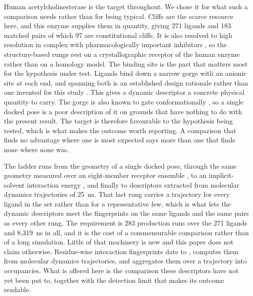 Human acetylcholinesterase is the target throughout. We chose it for what such a
comparison needs rather than for being typical. Cliffs are the scarce resource here,
and this enzyme supplies them in quantity, giving 271 ligands and 183 matched pairs of
which 97 are constitutional cliffs. It is also resolved to high resolution in complex
with pharmacologically important inhibitors \citep{cheung2012}, so the structure-based
rungs rest on a crystallographic receptor of the human enzyme rather than on a homology
model. The binding site is the part that matters most for the hypothesis under test.
Ligands bind down a narrow gorge with an anionic site at each end, and spanning both is
an established design rationale rather than one invented for this study
\citep{grabowska2025}. This gives a dynamic descriptor a concrete physical quantity to
carry. The gorge is also known to gate conformationally \citep{gating1998,gorge2017},
so a single docked pose is a poor description of it on grounds that have nothing to do
with the present result. The target is therefore favourable to the hypothesis being
tested, which is what makes the outcome worth reporting. A comparison that finds no
advantage where one is most expected says more than one that finds none where none was.

The ladder runs from the geometry of a single docked pose, through the same geometry
measured over an eight-member receptor ensemble \citep{amaro2018}, to an
implicit-solvent interaction energy \citep{genheden2015}, and finally to descriptors
extracted from molecular dynamics trajectories of \SI{25}{\nano\second}. That last
rung carries a trajectory for every ligand in the set rather than for a representative
few, which is what lets the dynamic descriptors meet the fingerprints on the same
ligands and the same pairs as every other rung. The requirement is 283 production runs
over the 271 ligands and 8{,}319~\si{\nano\second} in all, and it is the cost of a
commensurable comparison rather than of a long simulation. Little of that
machinery is new and this paper does not claim otherwise. Residue-wise interaction
fingerprints date to \citet{sift2004}, \citet{prolif2021} computes them from molecular
dynamics trajectories, and \citet{ifp_md_2024} aggregates them over a trajectory into
occupancies. What is offered here is the comparison these descriptors have not yet been
put to, together with the detection limit that makes its outcome readable.
